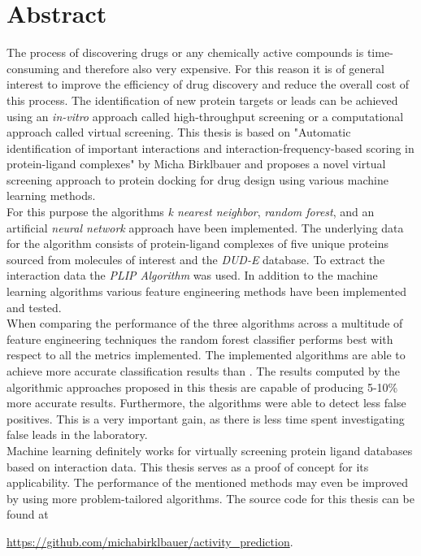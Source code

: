 \chapter{Abstract}

The process of discovering drugs or any chemically active compounds is time-consuming and therefore also very expensive.
For this reason it is of general interest to improve the efficiency of drug discovery and reduce the overall cost of this process.
The identification of new protein targets or leads can be achieved using an \textit{in-vitro} approach called high-throughput screening or a computational 
approach called virtual screening. 
This thesis is based on "Automatic identification of important interactions and interaction-frequency-based scoring in protein-ligand complexes" by Micha Birklbauer\cite[]{Birklbauer2021} and
proposes a novel virtual screening approach to protein docking for drug design using various machine learning methods.
\\
For this purpose the algorithms \textit{k nearest neighbor}, \textit{random forest}, and an artificial \textit{neural network} approach have been implemented.
The underlying data for the algorithm consists of protein-ligand complexes of five unique proteins sourced from molecules of interest and the \textit{DUD-E} database\cite[]{Mysinger2012}.
To extract the interaction data the \textit{PLIP Algorithm}\cite[]{Salentin2015} was used.
In addition to the machine learning algorithms various feature engineering methods have been implemented and tested.
\\
When comparing the performance of the three algorithms across a multitude of feature engineering techniques the random forest classifier performs 
best with respect to all the metrics implemented.
The implemented algorithms are able to achieve more accurate classification results than \cite[]{Birklbauer2021}. The results computed by the algorithmic approaches proposed in this thesis
are capable of producing 5-10\% more accurate results. Furthermore, the algorithms were able to detect less false positives. This is a very important gain, as there is less time spent 
investigating false leads in the laboratory.
\\
Machine learning definitely works for virtually screening protein ligand databases based on interaction data. This thesis serves as a proof of concept for its applicability.
The performance of the mentioned methods may even be improved by using more problem-tailored algorithms. 
The source code for this thesis can be found at

\href{https://github.com/michabirklbauer/activity_prediction}{https://github.com/michabirklbauer/activity\_prediction}. 
